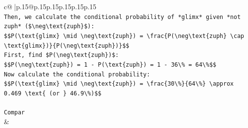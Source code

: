 \documentclass{article}
\begin{document}
{\begin{supertabular}{c@{$\;$}|p{.15\linewidth}@{}p{.15\linewidth}p{.15\linewidth}p{.15\linewidth}p{.15\linewidth}p{.15\linewidth}}
{{{\\ 
\texttt{Then, we calculate the conditional probability of *glimx* given *not zuph* (\$\textbackslash{}neg\textbackslash{}text\{zuph\}\$):} \\
\texttt{\$\$P(\textbackslash{}text\{glimx\} \textbackslash{}mid \textbackslash{}neg\textbackslash{}text\{zuph\}) = \textbackslash{}frac\{P(\textbackslash{}neg\textbackslash{}text\{zuph\} \textbackslash{}cap \textbackslash{}text\{glimx\})\}\{P(\textbackslash{}neg\textbackslash{}text\{zuph\})\}\$\$} \\
\texttt{First, find \$P(\textbackslash{}neg\textbackslash{}text\{zuph\})\$:} \\
\texttt{\$\$P(\textbackslash{}neg\textbackslash{}text\{zuph\}) = 1 {-} P(\textbackslash{}text\{zuph\}) = 1 {-} 36\textbackslash{}\% = 64\textbackslash{}\%\$\$} \\
\texttt{Now calculate the conditional probability:} \\
\texttt{\$\$P(\textbackslash{}text\{glimx\} \textbackslash{}mid \textbackslash{}neg\textbackslash{}text\{zuph\}) = \textbackslash{}frac\{30\textbackslash{}\%\}\{64\textbackslash{}\%\} \textbackslash{}approx 0.469 \textbackslash{}text\{ (or \} 46.9\textbackslash{}\%)\$\$} \\
\\ 
\texttt{Compar} \\
            }
        }
    }
    & \\ \\


\end{supertabular}}
\end{document}
